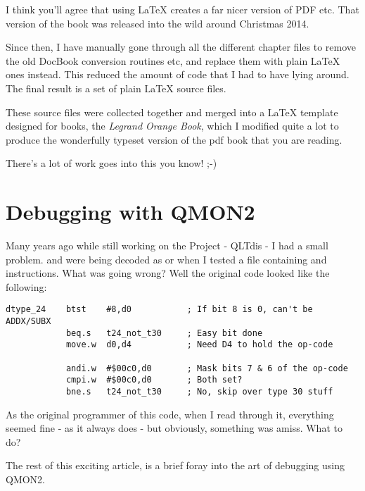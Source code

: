 \begin{appendix}
I think you'll agree that using \LaTeX{}\program{\LaTeX{}} creates a far nicer version of PDF etc. That version of the book was released into the wild around Christmas 2014. 

Since then, I have manually gone through all the different chapter files to remove the old DocBook conversion routines etc, and replace them with plain \LaTeX{}\program{\LaTeX{}} ones instead. This reduced the amount of code that I had to have lying around. The final result is a set of plain \LaTeX{}\program{\LaTeX{}} source files.

These source files were collected together and merged into a \LaTeX{}\program{\LaTeX{}} template designed for books, the \emph{Legrand Orange Book}, which I modified quite a lot to produce the wonderfully typeset version of the pdf book that you are reading. 

There's a lot of work goes into this you know! ;-)

\chapter{Debugging with QMON2}
\label{debugging-with-qmon2}%

Many years ago while still working on the Project - QLTdis - I had a small problem.  and  were being decoded as  or   when I tested a file containing  and
 instructions. What was going wrong? Well the original code looked like the
following:

\begin{lstlisting}[firstnumber=1,caption={QLTdis Broken Code}]
dtype_24    btst    #8,d0           ; If bit 8 is 0, can't be ADDX/SUBX
            beq.s   t24_not_t30     ; Easy bit done
            move.w  d0,d4           ; Need D4 to hold the op-code

            andi.w  #$00c0,d0       ; Mask bits 7 & 6 of the op-code
            cmpi.w  #$00c0,d0       ; Both set?
            bne.s   t24_not_t30     ; No, skip over type 30 stuff
\end{lstlisting}

As the original programmer of this code, when I read through it, everything
seemed fine -{} as it always does -{} but obviously, something was amiss. What to do?

The rest
of this exciting article, is a brief foray into the art of debugging using
QMON2.


\end{appendix}
